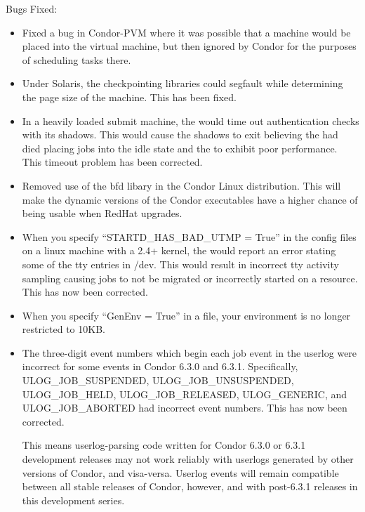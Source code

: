 \noindent Bugs Fixed:

\begin{itemize}

\item
Fixed a bug in Condor-PVM where it was possible that a machine would be 
placed into the virtual machine, but then ignored by Condor for the purposes
of scheduling tasks there.

\item
Under Solaris, the checkpointing libraries could segfault while determining
the page size of the machine. 
This has been fixed.

\item
In a heavily loaded submit machine, the  would time out
authentication checks with its shadows. 
This would cause the shadows to
exit believing the  had died placing jobs into the idle
state and the  to exhibit poor performance.
This timeout problem has been corrected.

\item
Removed use of the bfd libary in the Condor Linux distribution. 
This will make the dynamic versions of the Condor executables have a
higher chance of being usable when RedHat upgrades.

\item
When you specify ``STARTD\_HAS\_BAD\_UTMP = True'' in the config files
on a linux machine with a 2.4+ kernel, the  would report
an error stating some of the tty entries in /dev. This would result
in incorrect tty activity sampling causing jobs to not be migrated or
incorrectly started on a resource. This has now been corrected.

\item 
When you specify ``GenEnv = True'' in a  file,
your environment is no longer restricted to 10KB.

\item
The three-digit event numbers which begin each job event in the
userlog were incorrect for some events in Condor 6.3.0 and 6.3.1.
Specifically, ULOG\_JOB\_SUSPENDED, ULOG\_JOB\_UNSUSPENDED,
ULOG\_JOB\_HELD, ULOG\_JOB\_RELEASED, ULOG\_GENERIC, and
ULOG\_JOB\_ABORTED had incorrect event numbers.  This has now been
corrected.

\Note This means userlog-parsing code written for Condor 6.3.0 or
6.3.1 development releases may not work reliably with userlogs
generated by other versions of Condor, and visa-versa.  Userlog events
will remain compatible between all stable releases of Condor, however,
and with post-6.3.1 releases in this development series.


\end{itemize}
